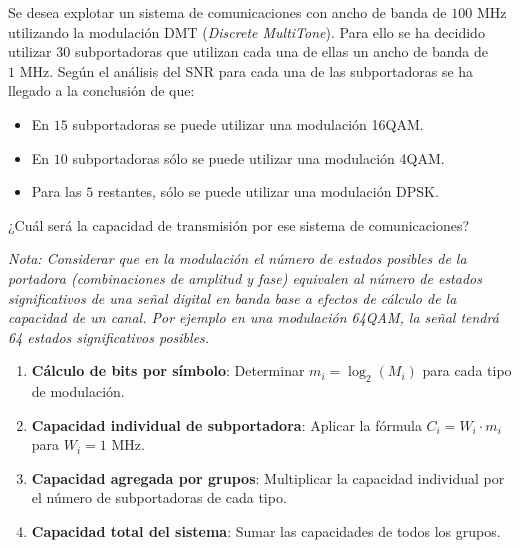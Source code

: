 \begin{problema}
Se desea explotar un sistema de comunicaciones con ancho de banda de $100\text{ MHz}$ utilizando la modulación DMT (\textit{Discrete MultiTone}). Para ello se ha decidido utilizar $30$ subportadoras que utilizan cada una de ellas un ancho de banda de $1\text{ MHz}$. Según el análisis del SNR para cada una de las subportadoras se ha llegado a la conclusión de que:

\begin{itemize}
    \item En $15$ subportadoras se puede utilizar una modulación 16QAM.
    \item En $10$ subportadoras sólo se puede utilizar una modulación 4QAM.
    \item Para las $5$ restantes, sólo se puede utilizar una modulación DPSK.
\end{itemize}

¿Cuál será la capacidad de transmisión por ese sistema de comunicaciones?

\textit{Nota: Considerar que en la modulación el número de estados posibles de la portadora (combinaciones de amplitud y fase) equivalen al número de estados significativos de una señal digital en banda base a efectos de cálculo de la capacidad de un canal. Por ejemplo en una modulación 64QAM, la señal tendrá 64 estados significativos posibles.}
\end{problema}

\begin{mecanizado}
\begin{enumerate}
    \item \textbf{Cálculo de bits por símbolo}: Determinar $m_i = \log_2(M_i)$ para cada tipo de modulación.
    \item \textbf{Capacidad individual de subportadora}: Aplicar la fórmula $C_i = W_i \cdot m_i$ para $W_i = 1\text{ MHz}$.
    \item \textbf{Capacidad agregada por grupos}: Multiplicar la capacidad individual por el número de subportadoras de cada tipo.
    \item \textbf{Capacidad total del sistema}: Sumar las capacidades de todos los grupos.
\end{enumerate}
\end{mecanizado}


